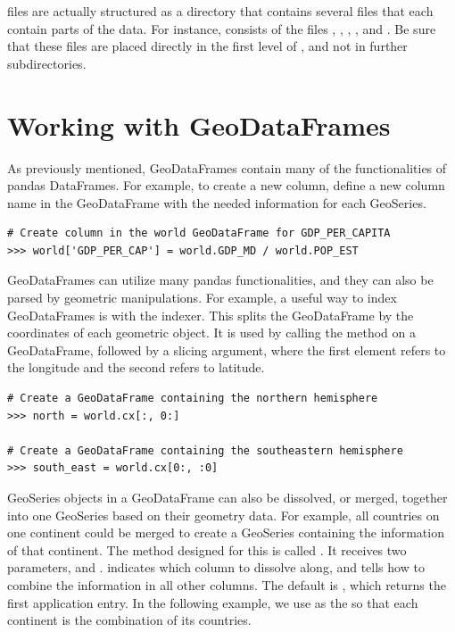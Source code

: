 \begin{info}
 files are actually structured as a directory that contains several files that each contain parts of the data.
For instance,  consists of the files , , , , and .
Be sure that these files are placed directly in the first level of , and not in further subdirectories.\\
\end{info}

\section*{Working with GeoDataFrames} %

As previously mentioned, GeoDataFrames contain many of the functionalities of pandas DataFrames.
For example, to create a new column, define a new column name in the GeoDataFrame with the needed information for each GeoSeries.

\begin{lstlisting}
# Create column in the world GeoDataFrame for GDP_PER_CAPITA
>>> world['GDP_PER_CAP'] = world.GDP_MD / world.POP_EST
\end{lstlisting}

GeoDataFrames can utilize many pandas functionalities, and they can also be parsed by geometric manipulations.
For example, a useful way to index GeoDataFrames is with the  indexer.
This splits the GeoDataFrame by the coordinates of each geometric object.
It is used by calling the method  on a GeoDataFrame, followed by a slicing argument, where the first element refers to the longitude and the second refers to latitude.

\begin{lstlisting}
# Create a GeoDataFrame containing the northern hemisphere
>>> north = world.cx[:, 0:]

# Create a GeoDataFrame containing the southeastern hemisphere
>>> south_east = world.cx[0:, :0]
\end{lstlisting}

GeoSeries objects in a GeoDataFrame can also be dissolved, or merged, together into one GeoSeries based on their geometry data.
For example, all countries on one continent could be merged to create a GeoSeries containing the information of that continent.
The method designed for this is called .
It receives two parameters,  and .
 indicates which column to dissolve along, and  tells how to combine the information in all other columns.
The default  is , which returns the first application entry.
In the following example, we use  as the  so that each continent is the combination of its countries.

